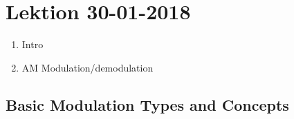 \section{Lektion 30-01-2018}

\begin{enumerate}
	\item Intro
	\item AM Modulation/demodulation
\end{enumerate}

\noindent{} \vspace{3mm}

\subsection{Basic Modulation Types and Concepts}

